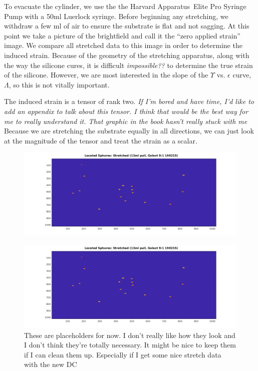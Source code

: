 To evacuate the cylinder, we use the the Harvard Apparatus\texttrademark \ Elite Pro Syringe Pump with a 50ml Luerlock syringe. Before beginning any stretching, we withdraw a few ml of air to ensure the substrate is flat and not sagging. At this point we take a picture of the brightfield and call it the ``zero applied strain'' image. We compare all stretched data to this image in order to determine the induced strain. Because of the geometry of the stretching apparatus, along with the way the silicone cures, it is difficult \emph{impossible??} to determine the true strain of the silicone. However, we are most interested in the slope of the $\Upsilon$ vs. $\epsilon$ curve, $\Lambda$, so this is not vitally important.

The induced strain is a tensor of rank two. \emph{If I'm bored and have time, I'd like to add an appendix to talk about this tensor. I think that would be the best way for me to really understand it. That graphic in the book hasn't really stuck with me} Because we are stretching the substrate equally in all directions, we can just look at the magnitude of the tensor and treat the strain as a scalar.     


\begin{figure}[h!]
	\centering
	\includegraphics[width=\linewidth]{Chapters/Figures/13ml_stretched_2D_located}
	\caption[Unstretched]{}
	\label{fig:13mlstretched2dlocated}
\end{figure}

\begin{figure}[h!]
	\centering
	\includegraphics[width=\linewidth]{Chapters/Figures/13ml_stretched_2D_located}
	\caption[Stretched]{These are placeholders for now. I don't really like how they look and I don't think they're totally necessary. It might be nice to keep them if I can clean them up. Especially if I get some nice stretch data with the new DC}
	\label{fig:13mlstretched2dlocated}
\end{figure}

%